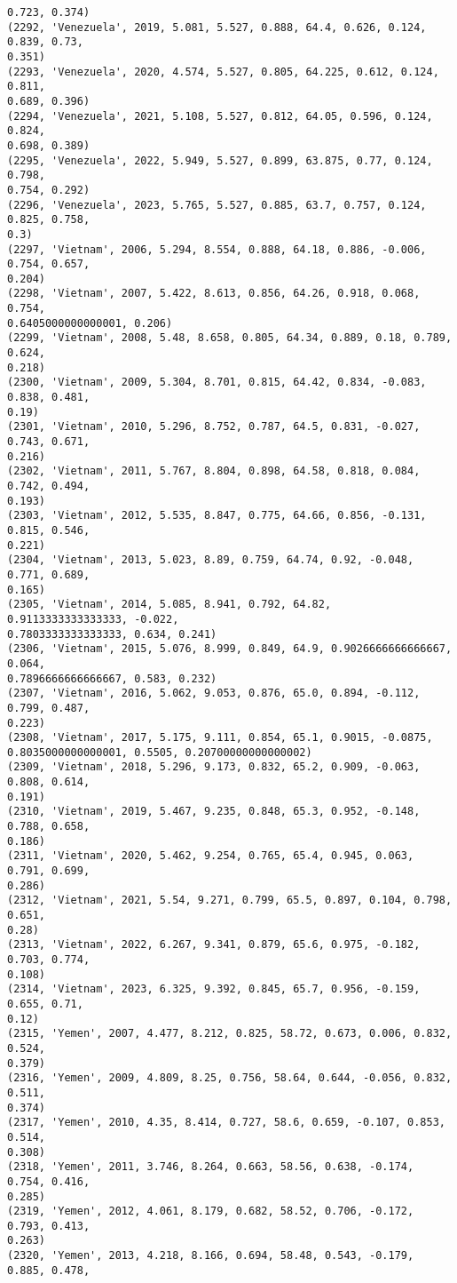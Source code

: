 \documentclass[11pt]{article}
\begin{document}
\begin{Verbatim}[commandchars=\\\{\}]
0.723, 0.374)
(2292, 'Venezuela', 2019, 5.081, 5.527, 0.888, 64.4, 0.626, 0.124, 0.839, 0.73,
0.351)
(2293, 'Venezuela', 2020, 4.574, 5.527, 0.805, 64.225, 0.612, 0.124, 0.811,
0.689, 0.396)
(2294, 'Venezuela', 2021, 5.108, 5.527, 0.812, 64.05, 0.596, 0.124, 0.824,
0.698, 0.389)
(2295, 'Venezuela', 2022, 5.949, 5.527, 0.899, 63.875, 0.77, 0.124, 0.798,
0.754, 0.292)
(2296, 'Venezuela', 2023, 5.765, 5.527, 0.885, 63.7, 0.757, 0.124, 0.825, 0.758,
0.3)
(2297, 'Vietnam', 2006, 5.294, 8.554, 0.888, 64.18, 0.886, -0.006, 0.754, 0.657,
0.204)
(2298, 'Vietnam', 2007, 5.422, 8.613, 0.856, 64.26, 0.918, 0.068, 0.754,
0.6405000000000001, 0.206)
(2299, 'Vietnam', 2008, 5.48, 8.658, 0.805, 64.34, 0.889, 0.18, 0.789, 0.624,
0.218)
(2300, 'Vietnam', 2009, 5.304, 8.701, 0.815, 64.42, 0.834, -0.083, 0.838, 0.481,
0.19)
(2301, 'Vietnam', 2010, 5.296, 8.752, 0.787, 64.5, 0.831, -0.027, 0.743, 0.671,
0.216)
(2302, 'Vietnam', 2011, 5.767, 8.804, 0.898, 64.58, 0.818, 0.084, 0.742, 0.494,
0.193)
(2303, 'Vietnam', 2012, 5.535, 8.847, 0.775, 64.66, 0.856, -0.131, 0.815, 0.546,
0.221)
(2304, 'Vietnam', 2013, 5.023, 8.89, 0.759, 64.74, 0.92, -0.048, 0.771, 0.689,
0.165)
(2305, 'Vietnam', 2014, 5.085, 8.941, 0.792, 64.82, 0.9113333333333333, -0.022,
0.7803333333333333, 0.634, 0.241)
(2306, 'Vietnam', 2015, 5.076, 8.999, 0.849, 64.9, 0.9026666666666667, 0.064,
0.7896666666666667, 0.583, 0.232)
(2307, 'Vietnam', 2016, 5.062, 9.053, 0.876, 65.0, 0.894, -0.112, 0.799, 0.487,
0.223)
(2308, 'Vietnam', 2017, 5.175, 9.111, 0.854, 65.1, 0.9015, -0.0875,
0.8035000000000001, 0.5505, 0.20700000000000002)
(2309, 'Vietnam', 2018, 5.296, 9.173, 0.832, 65.2, 0.909, -0.063, 0.808, 0.614,
0.191)
(2310, 'Vietnam', 2019, 5.467, 9.235, 0.848, 65.3, 0.952, -0.148, 0.788, 0.658,
0.186)
(2311, 'Vietnam', 2020, 5.462, 9.254, 0.765, 65.4, 0.945, 0.063, 0.791, 0.699,
0.286)
(2312, 'Vietnam', 2021, 5.54, 9.271, 0.799, 65.5, 0.897, 0.104, 0.798, 0.651,
0.28)
(2313, 'Vietnam', 2022, 6.267, 9.341, 0.879, 65.6, 0.975, -0.182, 0.703, 0.774,
0.108)
(2314, 'Vietnam', 2023, 6.325, 9.392, 0.845, 65.7, 0.956, -0.159, 0.655, 0.71,
0.12)
(2315, 'Yemen', 2007, 4.477, 8.212, 0.825, 58.72, 0.673, 0.006, 0.832, 0.524,
0.379)
(2316, 'Yemen', 2009, 4.809, 8.25, 0.756, 58.64, 0.644, -0.056, 0.832, 0.511,
0.374)
(2317, 'Yemen', 2010, 4.35, 8.414, 0.727, 58.6, 0.659, -0.107, 0.853, 0.514,
0.308)
(2318, 'Yemen', 2011, 3.746, 8.264, 0.663, 58.56, 0.638, -0.174, 0.754, 0.416,
0.285)
(2319, 'Yemen', 2012, 4.061, 8.179, 0.682, 58.52, 0.706, -0.172, 0.793, 0.413,
0.263)
(2320, 'Yemen', 2013, 4.218, 8.166, 0.694, 58.48, 0.543, -0.179, 0.885, 0.478,

\end{Verbatim}
\end{document}
